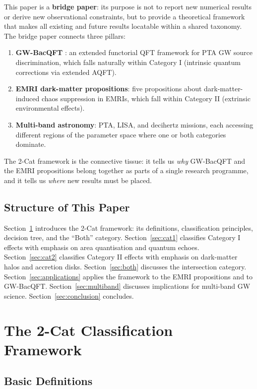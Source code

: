 \documentclass[11pt]{article}
\begin{document}
This paper is a \textbf{bridge paper}: its purpose is not to report new numerical results or derive new observational constraints, but to provide a theoretical framework that makes all existing and future results locatable within a shared taxonomy. The bridge paper connects three pillars:

\begin{enumerate}
\item \textbf{GW-BacQFT} \cite{GW-BacQFT}: an extended functorial QFT framework for PTA GW source discrimination, which falls naturally within Category I (intrinsic quantum corrections via extended AQFT).
\item \textbf{EMRI dark-matter propositions}: five propositions about dark-matter-induced chaos suppression in EMRIs, which fall within Category II (extrinsic environmental effects).
\item \textbf{Multi-band astronomy}: PTA, LISA, and decihertz missions, each accessing different regions of the parameter space where one or both categories dominate.
\end{enumerate}

The 2-Cat framework is the connective tissue: it tells us \emph{why} GW-BacQFT and the EMRI propositions belong together as parts of a single research programme, and it tells us \emph{where} new results must be placed.

\subsection{Structure of This Paper}

Section~\ref{sec:2cat} introduces the 2-Cat framework: its definitions, classification principles, decision tree, and the ``Both'' category. Section~\ref{sec:cat1} classifies Category I effects with emphasis on area quantisation and quantum echoes. Section~\ref{sec:cat2} classifies Category II effects with emphasis on dark-matter halos and accretion disks. Section~\ref{sec:both} discusses the intersection category. Section~\ref{sec:applications} applies the framework to the EMRI propositions and to GW-BacQFT. Section~\ref{sec:multiband} discusses implications for multi-band GW science. Section~\ref{sec:conclusion} concludes.

\section{The 2-Cat Classification Framework}\label{sec:2cat}

\subsection{Basic Definitions}
\end{document}

